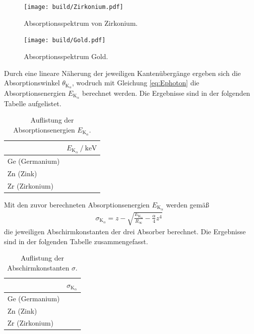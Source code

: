 \begin{figure}[H]
  \centering
  \texttt{[image: build/Zirkonium.pdf]}
  \caption{Absorptionsspektrum von Zirkonium.}
  \label{fig:plot7}
\end{figure}

\begin{figure}[H]
  \centering
  \texttt{[image: build/Gold.pdf]}
  \caption{Absorptionsspektrum Gold.}
  \label{fig:plot8}
\end{figure}

Durch eine lineare Näherung der jeweiligen Kantenübergänge ergeben sich die Absorptionswinkel $\theta_{\text{K}_\alpha}$, wodruch mit Gleichung \ref{eq:Ephoton}
die  Absorptionsenergien $E_{\text{K}_\alpha} $ berechnet werden. Die Ergebnisse sind in der folgenden Tabelle aufgelistet.

\begin{table}
  \centering
  \begin{tabular}{lS}
    \toprule
    & {$E_{\text{K}_\alpha} \:/\: \si{\kilo\electronvolt}$} \\
    \midrule
    Ge (Germanium)     & $ $  \\
    Zn (Zink)          & $ $       \\
    Zr (Zirkonium)     & $ $   \\
    \bottomrule
  \end{tabular}
  \caption{Auflistung der Absorptionsenergien $E_{\text{K}_\alpha} $.}
  \label{tab:2}
\end{table}

Mit den zuvor berechneten Absorptionsenergien $E_{\text{K}_\alpha} $ werden gemäß
\begin{align}
  \sigma_{\text{K}_\alpha} = z - \sqrt{\frac{E_{\text{K}_\alpha}}{R_\infty}-\frac{\alpha}{4}z^4}
\end{align}
die jeweiligen Abschirmkonstanten der drei Absorber berechnet. Die Ergebnisse sind in der folgenden Tabelle zusammengefasst.

\begin{table}
  \centering
  \begin{tabular}{lS}
    \toprule
    & {$\sigma_{\text{K}_\alpha}$} \\
    \midrule
    Ge (Germanium)     & $ $  \\
    Zn (Zink)          & $ $       \\
    Zr (Zirkonium)     & $ $   \\
    \bottomrule
  \end{tabular}
  \caption{Auflistung der Abschirmkonstanten $\sigma $.}
  \label{tab:3}
\end{table}



